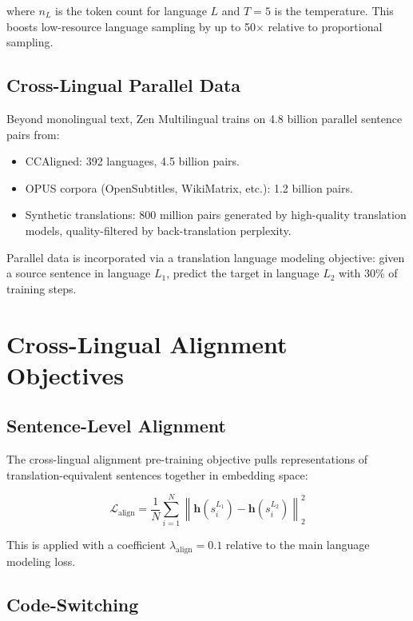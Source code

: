 \documentclass[11pt,a4paper]{article}
\begin{document}
where $n_L$ is the token count for language $L$ and $T = 5$ is the temperature. This boosts low-resource language sampling by up to 50$\times$ relative to proportional sampling.

\subsection{Cross-Lingual Parallel Data}

Beyond monolingual text, Zen Multilingual trains on 4.8 billion parallel sentence pairs from:

\begin{itemize}
  \item CCAligned: 392 languages, 4.5 billion pairs.
  \item OPUS corpora (OpenSubtitles, WikiMatrix, etc.): 1.2 billion pairs.
  \item Synthetic translations: 800 million pairs generated by high-quality translation models, quality-filtered by back-translation perplexity.
\end{itemize}

Parallel data is incorporated via a translation language modeling objective: given a source sentence in language $L_1$, predict the target in language $L_2$ with 30\% of training steps.

\section{Cross-Lingual Alignment Objectives}

\subsection{Sentence-Level Alignment}

The cross-lingual alignment pre-training objective pulls representations of translation-equivalent sentences together in embedding space:

\begin{equation}
\mathcal{L}_{\text{align}} = \frac{1}{N} \sum_{i=1}^N \left\|\mathbf{h}(s_i^{L_1}) - \mathbf{h}(s_i^{L_2})\right\|_2^2
\end{equation}

This is applied with a coefficient $\lambda_{\text{align}} = 0.1$ relative to the main language modeling loss.

\subsection{Code-Switching}
\end{document}
